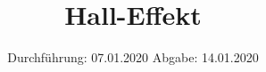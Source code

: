 

\subject{Versuchsnummer: 311}
\title{Hall-Effekt}
\date{%
  Durchführung: 07.01.2020
  \hspace{3em}
  Abgabe: 14.01.2020
}



\maketitle
\thispagestyle{empty}
\tableofcontents
\newpage




\newpage
\nocite{*}
\printbibliography


